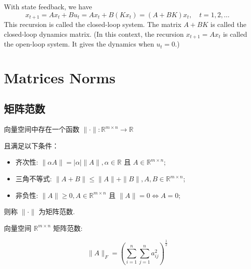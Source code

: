 With state feedback, we have
$$
x_{t+1}=A x_{t}+B u_{t}=A x_{t}+B\left(K x_{t}\right)=(A+B K) x_{t}, \quad t=1,2, \ldots
$$
This recursion is called the closed-loop system. The matrix $ A+B K $ is called the closed-loop dynamics matrix. (In this context, the recursion $ x_{t+1}=A x_{t} $ is called the open-loop system. It gives the dynamics when $ u_{t}=0 $.)






























\chapter{Matrices Norms}

\section{矩阵范数}

\begin{definition}
    向量空间中存在一个函数 $ \|\cdot\|: \mathbb{R}^{m \times n} \rightarrow \mathbb{R} $

    且满足以下条件：

    \begin{itemize}
        \item 齐次性: $ \|\alpha A\|=|\alpha|\|A\|, \alpha \in \mathbb{R} $ 且 $ A \in \mathbb{R}^{m \times n} $;
        \item 三角不等式: $ \|A+B\| \leq\|A\|+\|B\|, A, B \in \mathbb{R}^{m \times n} $;
        \item 非负性: $ \|A\| \geq 0, A \in \mathbb{R}^{m \times n} $ 且 $ \|A\|=0 \Leftrightarrow A=0 $;
    \end{itemize}

则称 $ \|\cdot\| $ 为矩阵范数. 
\end{definition}

向量空间 $ \mathbb{R}^{m \times n} $ 矩阵范数:

\begin{example}
    $$ \|A\|_{F}=\left(\sum_{i=1}^{n} \sum_{j=1}^{n} a_{i j}^{2}\right)^{\frac{1}{2}} $$
\end{example}

